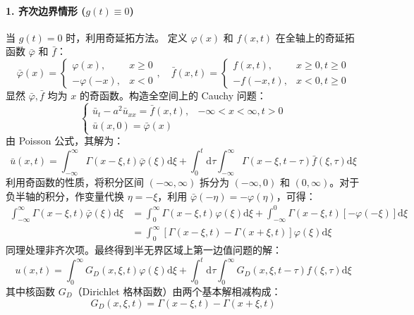 \documentclass[12pt,a4paper]{ctexart}
\begin{document}
	\paragraph{1. 齐次边界情形 ($g(t) \equiv 0$)}
	当 $g(t) = 0$ 时，利用奇延拓方法。
	定义 $\varphi(x)$ 和 $f(x,t)$ 在全轴上的奇延拓函数 $\bar{\varphi}$ 和 $\bar{f}$：
	\[
	\bar{\varphi}(x) = \begin{cases} \varphi(x), & x \geqslant 0 \\ -\varphi(-x), & x < 0 \end{cases}, \quad
	\bar{f}(x,t) = \begin{cases} f(x,t), & x \geqslant 0, t \geqslant 0 \\ -f(-x,t), & x < 0, t \geqslant 0 \end{cases}
	\]
	显然 $\bar{\varphi}, \bar{f}$ 均为 $x$ 的奇函数。构造全空间上的 Cauchy 问题：
	\[
	\begin{cases}
		\bar{u}_t - a^2 \bar{u}_{xx} = \bar{f}(x,t), & -\infty < x < \infty, t > 0 \\
		\bar{u}(x,0) = \bar{\varphi}(x)
	\end{cases}
	\]
	由 Poisson 公式，其解为：
	\[
	\bar{u}(x,t) = \int_{-\infty}^{\infty} \Gamma(x-\xi, t) \bar{\varphi}(\xi) \mathrm{d}\xi + \int_0^t \mathrm{d}\tau \int_{-\infty}^{\infty} \Gamma(x-\xi, t-\tau) \bar{f}(\xi, \tau) \mathrm{d}\xi
	\]
	利用奇函数的性质，将积分区间 $(-\infty, \infty)$ 拆分为 $(-\infty, 0)$ 和 $(0, \infty)$。对于负半轴的积分，作变量代换 $\eta = -\xi$，利用 $\bar{\varphi}(-\eta) = -\varphi(\eta)$，可得：
	\begin{align*}
		\int_{-\infty}^{\infty} \Gamma(x-\xi, t) \bar{\varphi}(\xi) \mathrm{d}\xi 
		&= \int_{0}^{\infty} \Gamma(x-\xi, t) \varphi(\xi) \mathrm{d}\xi + \int_{-\infty}^{0} \Gamma(x-\xi, t) [-\varphi(-\xi)] \mathrm{d}\xi \\
		&= \int_{0}^{\infty} \left[ \Gamma(x-\xi, t) - \Gamma(x+\xi, t) \right] \varphi(\xi) \mathrm{d}\xi
	\end{align*}
	同理处理非齐次项。最终得到半无界区域上第一边值问题的解：
	\begin{equation}
		u(x,t) = \int_{0}^{\infty} G_D(x, \xi, t) \varphi(\xi) \mathrm{d}\xi + \int_0^t \mathrm{d}\tau \int_{0}^{\infty} G_D(x, \xi, t-\tau) f(\xi, \tau) \mathrm{d}\xi
	\end{equation}
	其中核函数 $G_D$（Dirichlet 格林函数）由两个基本解相减构成：
	\begin{equation}
		G_D(x, \xi, t) = \Gamma(x-\xi, t) - \Gamma(x+\xi, t)
	\end{equation}
	
\end{document}
